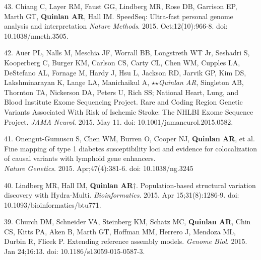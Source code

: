 \documentclass[margin,line]{cv}
\begin{document}
\begin{resume}
\begin{list}{*}{}
    \item[43.] Chiang C, Layer RM, Faust GG, Lindberg MR, Rose DB, Garrison EP, Marth GT, \textbf{Quinlan AR}, Hall IM.
    SpeedSeq: Ultra-fast personal genome analysis and interpretation
    \emph{Nature Methods}. 2015. Oct;12(10):966-8. doi: 10.1038/nmeth.3505.

    \item[42.] Auer PL, Nalls M, Meschia JF, Worrall BB, Longstreth WT Jr, Seshadri S, Kooperberg C, Burger KM, Carlson CS,
    Carty CL, Chen WM, Cupples LA, DeStefano AL, Fornage M, Hardy J, Hsu L, Jackson RD, Jarvik GP, Kim DS,
    Lakshminarayan K, Lange LA, Manichaikul A,  $\star$$\star$\textit{Quinlan AR}, Singleton AB, Thornton TA,
    Nickerson DA, Peters U, Rich SS; National Heart, Lung, and Blood Institute Exome Sequencing Project.
    Rare and Coding Region Genetic Variants Associated With Risk of Ischemic Stroke: The NHLBI Exome Sequence Project.
    \emph{JAMA Neurol}. 2015. May 11. doi: 10.1001/jamaneurol.2015.0582.

    \item[41.] Onengut-Gumuscu S, Chen WM, Burren O, Cooper NJ, \textbf{Quinlan AR}, et al.
    Fine mapping of type 1 diabetes susceptibility loci and evidence for colocalization of causal variants with lymphoid gene enhancers.\\
    \emph{Nature Genetics}. 2015. Apr;47(4):381-6. doi: 10.1038/ng.3245

    \item[40.] Lindberg MR, Hall IM, \textbf{Quinlan AR}$\dagger$.
    Population-based structural variation discovery with Hydra-Multi.
    \emph{Bioinformatics}. 2015. Apr 15;31(8):1286-9. doi: 10.1093/bioinformatics/btu771.

    \item[39.] Church DM, Schneider VA, Steinberg KM, Schatz MC, \textbf{Quinlan AR}, Chin CS, Kitts PA, Aken B, Marth GT,
    Hoffman MM, Herrero J, Mendoza ML, Durbin R, Flicek P.
    Extending reference assembly models.
    \emph{Genome Biol}. 2015. Jan 24;16:13. doi: 10.1186/s13059-015-0587-3.
    

\end{list}
\end{resume}
\end{document}
